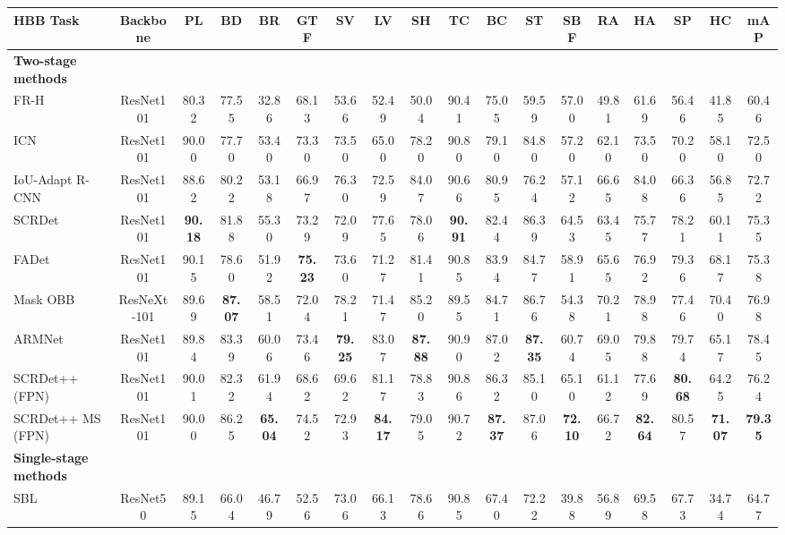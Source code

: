 \documentclass[10pt,journal,compsoc]{IEEEtran}
\begin{document}
\begin{table*}
{\begin{tabular}{l|c|c|c|c|c|c|c|c|c|c|c|c|c|c|c|c|c}
			\hline
			\textbf{HBB Task} & Backbone &  PL &  BD &  BR &  GTF &  SV &  LV &  SH &  TC &  BC &  ST &  SBF &  RA &  HA &  SP &  HC &  mAP\\
			\hline
			\textbf{Two-stage methods} & \multicolumn{16}{|c}{} \\
			\hline
			FR-H \cite{ren2017faster} & ResNet101 & 80.32 & 77.55 & 32.86 & 68.13 & 53.66 & 52.49 & 50.04 & 90.41 & 75.05 & 59.59 & 57.00 & 49.81 & 61.69 & 56.46 & 41.85 & 60.46 \\
			ICN \cite{azimi2018towards} & ResNet101 & 90.00 & 77.70 & 53.40 & 73.30 & 73.50 & 65.00 & 78.20 & 90.80 & 79.10 & 84.80 & 57.20 & 62.10 & 73.50 & 70.20 & 58.10 & 72.50 \\
			IoU-Adapt R-CNN \cite{yan2019iou} & ResNet101 & 88.62 & 80.22 & 53.18 & 66.97 & 76.30 & 72.59 & 84.07 & 90.66 & 80.95 & 76.24 & 57.12 & 66.65 & 84.08 & 66.36 & 56.85 & 72.72 \\
			SCRDet \cite{yang2019scrdet} & ResNet101 & {\bf 90.18} & 81.88 & 55.30 & 73.29 & 72.09 & 77.65 & 78.06 & {\bf 90.91} & 82.44 & 86.39 & 64.53 & 63.45 & 75.77 & 78.21 & 60.11 & 75.35 \\
			FADet \cite{li2019feature} & ResNet101 & 90.15 & 78.60 & 51.92 & \textbf{75.23} & 73.60 & 71.27 & 81.41 & 90.85 & 83.94 & 84.77 & 58.91 & 65.65 & 76.92 & 79.36 & 68.17 & 75.38\\
			Mask OBB \cite{wang2019mask} & ResNeXt-101 & 89.69 & \textbf{87.07} & 58.51 & 72.04 & 78.21 & 71.47 & 85.20 & 89.55 & 84.71 & 86.76 & 54.38 & 70.21 & 78.98 & 77.46 & 70.40 & 76.98 \\
			ARMNet \cite{qiu2019a2rmnet} & ResNet101 & 89.84 & 83.39 & 60.06 & 73.46 & \textbf{79.25} & 83.07 & \textbf{87.88} & 90.90 & 87.02 & \textbf{87.35} & 60.74 & 69.05 & 79.88 & 79.74 & 65.17 & 78.45\\
			SCRDet++ (FPN) & ResNet101 & 90.01 & 82.32 & 61.94 & 68.62 & 69.62 & 81.17 & 78.83 & 90.86 & 86.32 & 85.10 & 65.10 & 61.12 & 77.69 & \textbf{80.68} & 64.25 & 76.24 \\
			SCRDet++ MS (FPN) & ResNet101 & 90.00 & 86.25 & \textbf{65.04} & 74.52 & 72.93 & \textbf{84.17} & 79.05 & 90.72 & \textbf{87.37} & 87.06 & \textbf{72.10} & 66.72 & \textbf{82.64} & 80.57 & \textbf{71.07} & \textbf{79.35} \\
			\hline
			\textbf{Single-stage methods} & \multicolumn{16}{|c}{} \\
			\hline
			SBL \cite{sun2018salience} & ResNet50 & 89.15 & 66.04 & 46.79 & 52.56 & 73.06 & 66.13 & 78.66 & 90.85 & 67.40 & 72.22 & 39.88 & 56.89 & 69.58 & 67.73 & 34.74 & 64.77 \\

\end{tabular}}
\end{table*}
\end{document}
